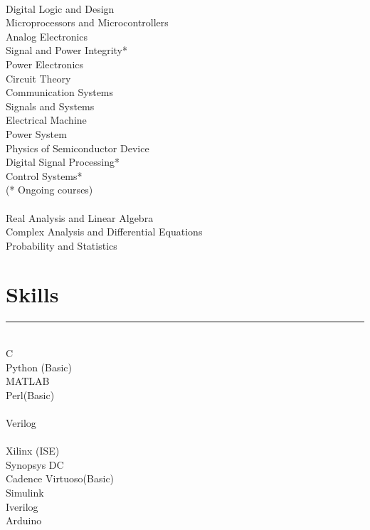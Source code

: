 \documentclass[]{resume}
\begin{document}
\begin{minipage}[t]{0.33\textwidth}
\vspace{-0.7em}
\\
Digital Logic and Design\\
Microprocessors and Microcontrollers\\
Analog Electronics\\
Signal and Power Integrity*\\
Power Electronics\\
Circuit Theory\\
Communication Systems\\
Signals and Systems\\
Electrical Machine\\
Power System\\
Physics of Semiconductor Device\\
Digital Signal Processing*\\
Control Systems*\\
(* Ongoing courses)\\

\vspace{-0.5em}
\\
Real Analysis and Linear Algebra\\
Complex Analysis and Differential Equations\\
Probability and Statistics\\
\sectionsep

\vspace{-1.5em}
\section{Skills}
\vspace{-0.5em}
\noindent\rule{5cm}{0.4pt}

\vspace{0.5em}
\\
C\\
Python (Basic)\\
MATLAB\\
Perl(Basic)\\

\vspace{-0.5em}
\\
Verilog\\

\vspace{-0.5em}
\\
Xilinx (ISE)\\
Synopsys DC\\
Cadence Virtuoso(Basic)\\
Simulink\\
Iverilog\\
Arduino\\
\sectionsep

%
%

\end{minipage} 
\end{document}
